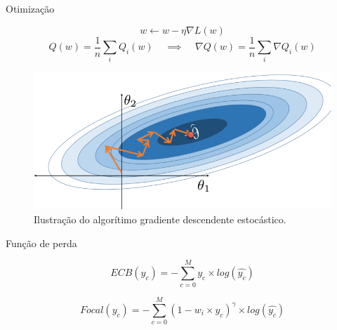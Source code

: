 \documentclass{beamer}
\begin{document}
\begin{frame}{Otimização}

\begin{equation}
    w \leftarrow w - \eta \nabla L(w)
\end{equation}
\begin{equation}
Q(w) = \frac{1}{n}\sum_i Q_i(w)\;\;\;\;\implies\;\;\;\; \nabla Q(w) = \frac{1}{n}\sum_i \nabla Q_i(w)
\end{equation}
\begin{figure}[!ht]
    \centering
        \includegraphics[width=0.6\columnwidth]{Imagens/stochastic_gradient_descent.PNG}
    \caption{Ilustração do algorítimo gradiente descendente estocástico. }
    \label{fig:SGD}
\end{figure}
\end{frame}

\begin{frame}{Função de perda}

    \begin{equation}
        ECB(y_c) = -\sum_{c=0}^{M} y_c \times log(\hat{y_c})
    \end{equation}

    \begin{equation}
        Focal(y_c) = -\sum_{c=0}^{M} (1-w_i \times y_c)^\gamma \times log(\hat{y_c})
    \end{equation}

\end{frame}
\end{document}
